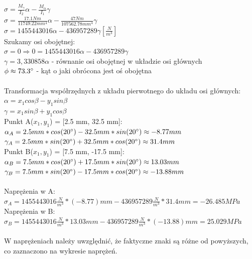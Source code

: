 \documentclass[11pt]{article}
\begin{document}
$\sigma = \frac{M_\gamma}{I_2}\alpha - \frac{M_\alpha}{I_1}\gamma$\\
$\sigma = \frac{17.1 Nm}{11749.22 mm^4}\alpha - \frac{47 Nm}{107562.78 mm^4}\gamma$\\
$\sigma = 1455443016\alpha - 436957289\gamma [\frac{N}{m^3}]$\\
Szukamy osi obojętnej:\\
$\sigma = 0   \Rightarrow   0 = 1455443016\alpha - 436957289\gamma$\\
$\gamma = 3,330858\alpha$  -  równanie osi obojętnej w układzie osi głównych\\
$\phi \approx 73.3\degree$ - kąt o jaki obrócona jest oś obojętna\\
\\
Transformacja współrzędnych z układu pierwotnego do układu osi głównych:\\
$\alpha = x_1cos\beta - y_1sin\beta$\\
$\gamma = x_1sin\beta + y_1cos\beta$\\
Punkt A($x_1,y_1$) = [2.5 mm, 32.5 mm]:\\
$\alpha_A = 2.5 mm * cos(20\degree) - 32.5 mm * sin(20\degree) \approx -8.77 mm$\\
$\gamma_A = 2.5 mm * sin(20\degree) + 32.5 mm * cos(20\degree) \approx 31.4 mm$\\
Punkt B($x_1,y_1$) = [7.5 mm, -17.5 mm]:\\
$\alpha_B = 7.5 mm * cos(20\degree) + 17.5 mm * sin(20\degree) \approx 13.03 mm$\\
$\gamma_B = 7.5 mm * sin(20\degree) - 17.5 mm * cos(20\degree)
\approx -13.88 mm$\\
\\
Naprężenia w A:\\
$\sigma_A = 1455443016 \frac{N}{m^3} * (-8.77) mm - 436957289 \frac{N}{m^3} * 31.4 mm = -26.485 MPa$\\
Naprężenia w B:\\
$\sigma_B = 1455443016 \frac{N}{m^3} * 13.03 mm - 436957289 \frac{N}{m^3} * (-13.88) mm = 25.029 MPa$\\
\\
W naprężeniach należy uwzględnić, że faktyczne znaki są różne od powyższych, co zaznaczono na wykresie naprężeń.\\
\end{document}
